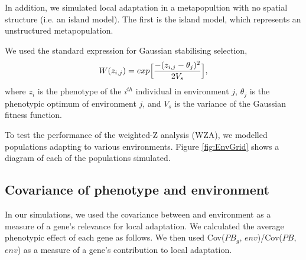 \documentclass[11pt,twoside,lineno]{GSA_format}
\begin{document}
In addition, we simulated local adaptation in a metapopultion with no spatial structure (i.e. an island model).  The first is the island model, which represents an unstructured metapopulation. 


We used the standard expression for Gaussian stabilising selection,
\begin{equation}
\notag
W(z_{i,j}) = exp \Big[\frac{-(z_{i,j} - \theta_j)^2}{2V_s}\Big],
\end{equation}
where $z_i$ is the phenotype of the $i^{th}$ individual in environment $j$, $\theta_j$ is the phenotypic optimum of environment $j$, and $V_s$ is the variance of the Gaussian fitness function. 

To test the performance of the weighted-Z analysis (WZA), we modelled populations adapting to various environments. Figure \ref{fig:EnvGrid} shows a diagram of each of the populations simulated.


\subsection{Covariance of phenotype and environment} 

In our simulations, we used the covariance between  and environment as a measure of a gene's relevance for local adaptation. We calculated the average phenotypic effect of each gene as follows.
We then used Cov($PB_g$, $env$)/Cov($PB$, $env$) as a measure of a gene's contribution to local adaptation.
\end{document}
